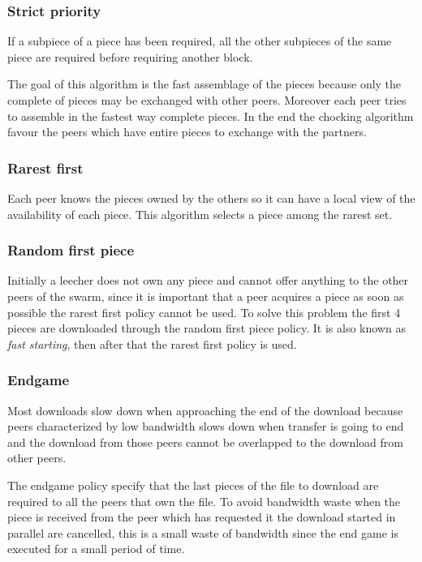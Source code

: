 \subsubsection{Strict priority}
If a subpiece of a piece has been required, all the other subpieces of the same piece are required before requiring another block.

The goal of this algorithm is the fast assemblage of the pieces because only the complete of pieces may be exchanged with other peers.
Moreover each peer tries to assemble in the fastest way complete pieces.
In the end the chocking algorithm favour the peers which have entire pieces to exchange with the partners.

\subsubsection{Rarest first}
Each peer knows the pieces owned by the others so it can have a local view of the availability of each piece.
This algorithm selects a piece among the rarest set.

\subsubsection{Random first piece}
Initially a leecher does not own any piece and cannot offer anything to the other peers of the swarm, since it is important that a peer acquires a piece as soon as possible the rarest first policy cannot be used.
To solve this problem the first 4 pieces are downloaded through the random first piece policy.
It is also known as \emph{fast starting}, then after that the rarest first policy is used.

\subsubsection{Endgame}
Most downloads slow down when approaching the end of the download because peers characterized by low bandwidth slows down when transfer is going to end and the download from those peers cannot be overlapped to the download from other peers.

The endgame policy specify that the last pieces of the file to download are required to all the peers that own the file.
To avoid bandwidth waste when the piece is received from the peer which has requested it the download started in parallel are cancelled, this is a small waste of bandwidth since the end game is executed for a small period of time.

